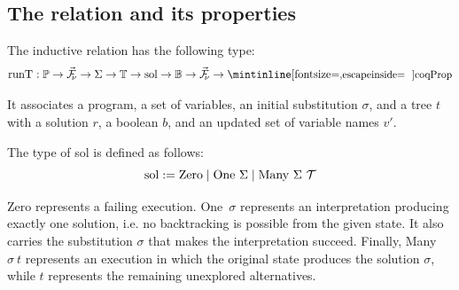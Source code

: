 







%   

\subsection{The \runT relation and its properties}\label{sec:runT}

The inductive relation \runT has the following type:
%
$$\mathrm{\runT} : \mathbb{P} \to \vec{\FV} \to \Sigma \to \mathbb{T} \to \mathrm{sol} \to \mathbb{B} \to \vec{\FV} \to \cI{Prop}$$

It associates a program, a set of variables, an initial substitution $\sigma$, and a
tree $t$ with a solution $r$, a boolean $b$, and an updated set of variable
names $v'$.

The type of sol is defined as follows:
%
$$\mathrm{sol} := \mathrm{Zero} \mid \mathrm{One}\ \Sigma \mid \mathrm{Many}\ \Sigma\ \TREE$$

Zero represents a failing execution. One\ $\sigma$ represents an interpretation
producing exactly one solution, i.e. no backtracking is possible from the given
state. It also carries the substitution $\sigma$ that makes the interpretation
succeed. Finally, Many $\sigma\ t$ represents an execution in which the
original state produces the solution $\sigma$, while $t$ represents the
remaining unexplored alternatives.

